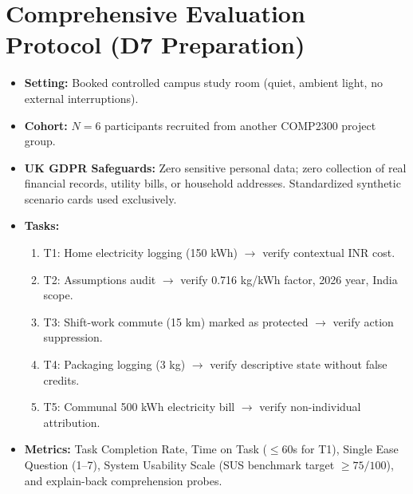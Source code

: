 \documentclass[12pt,a4paper]{article}
\begin{document}
\section{Comprehensive Evaluation Protocol (D7 Preparation)}
\begin{itemize}[leftmargin=*]
  \item \textbf{Setting:} Booked controlled campus study room (quiet, ambient light, no external interruptions).
  \item \textbf{Cohort:} $N=6$ participants recruited from another COMP2300 project group.
  \item \textbf{UK GDPR Safeguards:} Zero sensitive personal data; zero collection of real financial records, utility bills, or household addresses. Standardized synthetic scenario cards used exclusively.
  \item \textbf{Tasks:}
    \begin{enumerate}
      \item T1: Home electricity logging (150 kWh) $\rightarrow$ verify contextual INR cost.
      \item T2: Assumptions audit $\rightarrow$ verify 0.716 kg/kWh factor, 2026 year, India scope.
      \item T3: Shift-work commute (15 km) marked as protected $\rightarrow$ verify action suppression.
      \item T4: Packaging logging (3 kg) $\rightarrow$ verify descriptive state without false credits.
      \item T5: Communal 500 kWh electricity bill $\rightarrow$ verify non-individual attribution.
    \end{enumerate}
  \item \textbf{Metrics:} Task Completion Rate, Time on Task ($\le 60$s for T1), Single Ease Question (1--7), System Usability Scale (SUS benchmark target $\ge 75/100$), and explain-back comprehension probes.
\end{itemize}
\end{document}
